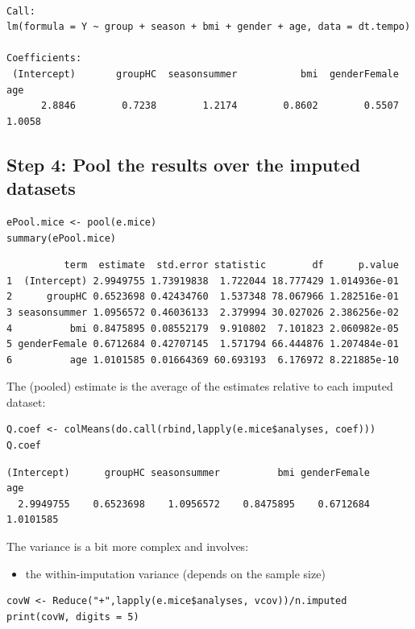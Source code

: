 \documentclass[12pt]{article}
\begin{document}
\begin{verbatim}

Call:
lm(formula = Y ~ group + season + bmi + gender + age, data = dt.tempo)

Coefficients:
 (Intercept)       groupHC  seasonsummer           bmi  genderFemale           age  
      2.8846        0.7238        1.2174        0.8602        0.5507        1.0058
\end{verbatim}


\clearpage

\subsection{Step 4: Pool the results over the imputed datasets}
\label{sec:orgf98cc3c}

\lstset{language=r,label= ,caption= ,captionpos=b,numbers=none}
\begin{lstlisting}
ePool.mice <- pool(e.mice)
summary(ePool.mice)
\end{lstlisting}

\begin{verbatim}
          term  estimate  std.error statistic        df      p.value
1  (Intercept) 2.9949755 1.73919838  1.722044 18.777429 1.014936e-01
2      groupHC 0.6523698 0.42434760  1.537348 78.067966 1.282516e-01
3 seasonsummer 1.0956572 0.46036133  2.379994 30.027026 2.386256e-02
4          bmi 0.8475895 0.08552179  9.910802  7.101823 2.060982e-05
5 genderFemale 0.6712684 0.42707145  1.571794 66.444876 1.207484e-01
6          age 1.0101585 0.01664369 60.693193  6.176972 8.221885e-10
\end{verbatim}



The (pooled) estimate is the average of the estimates relative to each
imputed dataset:
\lstset{language=r,label= ,caption= ,captionpos=b,numbers=none}
\begin{lstlisting}
Q.coef <- colMeans(do.call(rbind,lapply(e.mice$analyses, coef)))
Q.coef
\end{lstlisting}

\begin{verbatim}
(Intercept)      groupHC seasonsummer          bmi genderFemale          age 
  2.9949755    0.6523698    1.0956572    0.8475895    0.6712684    1.0101585
\end{verbatim}


The variance is a bit more complex and involves:
\begin{itemize}
\item the within-imputation variance (depends on the sample size)
\end{itemize}
\lstset{language=r,label= ,caption= ,captionpos=b,numbers=none}
\begin{lstlisting}
covW <- Reduce("+",lapply(e.mice$analyses, vcov))/n.imputed
print(covW, digits = 5)
\end{lstlisting}
\end{document}
